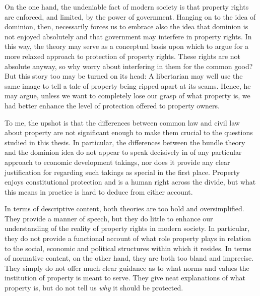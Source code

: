 On the one hand, the undeniable fact of modern society is that property rights are enforced, and limited, by the power of government. Hanging on to the idea of dominion, then, necessarily forces us to embrace also the idea that dominion is not enjoyed absolutely and that government may interfere in property rights. In this way, the theory may serve as a conceptual basis upon which to argue for a more relaxed approach to protection of property rights. These rights are not absolute anyway, so why worry about interfering in them for the common good? But this story too may be turned on its head: A libertarian may well use the same image to tell a tale of property being ripped apart at its seams. Hence, he may argue, unless we want to completely lose our grasp of what property is, we had better enhance the level of protection offered to property owners.

To me, the upshot is that the differences between common law and civil law  about property are not significant enough to make them crucial to the questions studied in this thesis. In particular, the differences between the bundle theory and the dominion idea do not appear to speak decisively in  of any particular approach to economic development takings, nor does it provide any clear justification for regarding such takings as special in the first place. Property enjoys constitutional protection and is a  human right across the divide, but what this means in practice is hard to deduce from either account.

In terms of descriptive content, both theories are too bold and oversimplified. They provide a manner of speech, but they do little to enhance our understanding of the reality of property rights in modern society. In particular, they do not provide a functional account of what role property plays in relation to the social, economic and political structures within which it resides. In terms of normative content, on the other hand, they are both too bland and imprecise. They simply do not offer much clear guidance as to what norms and values the institution of property is meant to serve. They give neat explanations of what property is, but do not tell us {\it why} it should be protected. 

